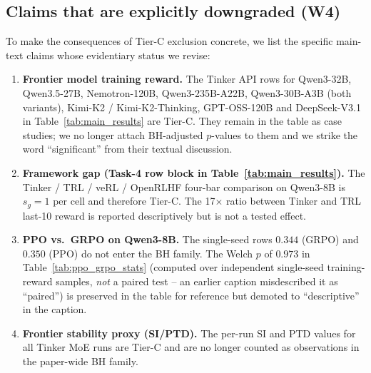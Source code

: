 \subsection{Claims that are explicitly downgraded (W4)}
\label{sec:stat-rigor-addendum:downgrades}

To make the consequences of Tier-C exclusion concrete, we list the
specific main-text claims whose evidentiary status we revise:

\begin{enumerate}
  \item \textbf{Frontier model training reward.} The Tinker API
    rows for Qwen3-32B, Qwen3.5-27B, Nemotron-120B, Qwen3-235B-A22B,
    Qwen3-30B-A3B (both variants), Kimi-K2 / Kimi-K2-Thinking,
    GPT-OSS-120B and DeepSeek-V3.1 in Table~\ref{tab:main_results}
    are Tier-C. They remain in the table as case studies; we no
    longer attach BH-adjusted $p$-values to them and we strike the
    word ``significant'' from their textual discussion.
  \item \textbf{Framework gap (Task-4 row block in
    Table~\ref{tab:main_results}).} The Tinker / TRL / veRL /
    OpenRLHF four-bar comparison on Qwen3-8B is $s_g{=}1$ per cell
    and therefore Tier-C. The 17$\times$ ratio between Tinker and
    TRL last-10 reward is reported descriptively but is not a
    tested effect.
  \item \textbf{PPO vs.\ GRPO on Qwen3-8B.} The single-seed rows
    $0.344$ (GRPO) and $0.350$ (PPO) do not enter the BH family.
    The Welch $p$ of $0.973$ in
    Table~\ref{tab:ppo_grpo_stats} (computed over independent
    single-seed training-reward samples, \emph{not} a paired test --
    an earlier caption misdescribed it as ``paired'')
    is preserved in the table for reference but demoted to
    ``descriptive'' in the caption.
  \item \textbf{Frontier stability proxy (SI/PTD).} The per-run SI
    and PTD values for all Tinker MoE runs are Tier-C and are no
    longer counted as observations in the paper-wide BH family.
\end{enumerate}

